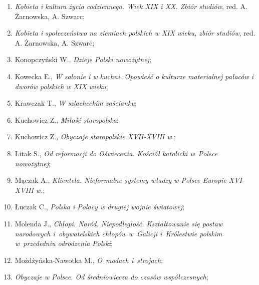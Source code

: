 \documentclass[a4paper,11pt]{article}
\begin{document}
\begin{enumerate}
\item \textit{Kobieta i kultura życia codziennego. Wiek XIX i XX. Zbiór
    studiów}, red. A. Żarnowska, A. Szwarc;



\item \textit{Kobieta i społeczeństwo na ziemiach polskich w XIX wieku,
    zbiór studiów}, red. A. Żarnowska, A. Szwarc;



\item Konopczyński W., \textit{Dzieje Polski nowożytnej};



\item Kowecka E., \textit{W salonie i w kuchni. Opowieść o kulturze
    materialnej pałaców i dworów polskich w XIX wieku};



\item Krawczak T., \textit{W szlacheckim zaścianku};



\item Kuchowicz Z., \textit{Miłość staropolska};



\item Kuchowicz Z., \textit{Obyczaje staropolskie XVII-XVIII w.};



\item Litak S., \textit{Od reformacji do Oświecenia. Kościół katolicki
    w~Polsce nowożytnej};



\item Mączak A., \textit{Klientela. Nieformalne systemy władzy w Polsce
    Europie XVI-XVIII w.};



\item Łuczak C., \textit{Polska i Polacy w drugiej wojnie światowej};



\item Molenda J., \textit{Chłopi. Naród. Niepodległość. Kształtowanie
    się postaw narodowych i~obywatelskich chłopów w~Galicji
    i~Królestwie polskim w~przededniu odrodzenia Polski};



\item Możdżyńska-Nawotka M., \textit{O~modach i~strojach};



\item \textit{Obyczaje w Polsce. Od średniowiecza do czasów
    współczesnych};




\end{enumerate}
\end{document}
